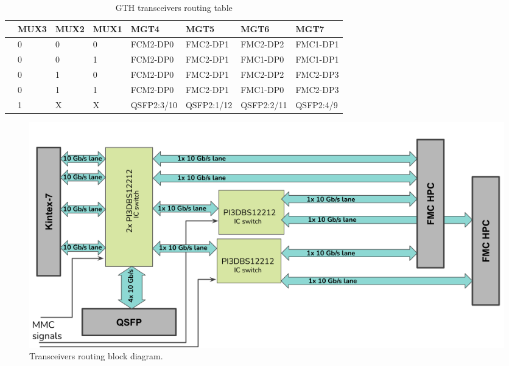 \documentclass[12pt,oneside,a4]{article}
\begin{document}
\begin{table}[htbp]
\begin{tabular}{@{}llllllll@{}}
\toprule
 & MUX3 & MUX2 & MUX1 & MGT4       & MGT5       & MGT6       & MGT7      \\ \midrule
 & 0    & 0    & 0    & FCM2-DP0   & FMC2-DP1   & FMC2-DP2   & FMC1-DP1  \\
 & 0    & 0    & 1    & FCM2-DP0   & FMC2-DP1   & FMC1-DP0   & FMC1-DP1  \\
 & 0    & 1    & 0    & FCM2-DP0   & FMC2-DP1   & FMC2-DP2   & FMC2-DP3  \\
 & 0    & 1    & 1    & FCM2-DP0   & FMC2-DP1   & FMC1-DP0   & FMC2-DP3  \\
 & 1    & X    & X    & QSFP2:3/10 & QSFP2:1/12 & QSFP2:2/11 & QSFP2:4/9 \\ \bottomrule
\end{tabular}
\caption{GTH transceivers routing table}\label{table}
\end{table}

\begin{figure}[H]
\begin{center}
\includegraphics[width=1\linewidth]{highspeed.png}
 \caption{Transceivers routing block diagram.}\label{highspeed}
\end{center}
\end{figure}
\end{document}
